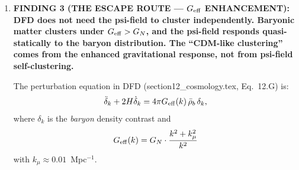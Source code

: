 \documentclass[11pt]{article}
\newcommand{\Geff}{G_{\rm eff}}
\newcommand{\kmu}{k_\mu}
\begin{document}
\begin{tcolorbox}[colback=red!5!white, colframe=red!70!black,
  title=\textbf{W4i17 TOP 5 FINDINGS --- EXISTENTIAL AUDIT: DUST BRANCH CLUSTERING}]
\begin{enumerate}
  \textbf{This is a HUGE Jeans scale.} At $z \sim 1000$: $k_J \sim
  2$~Mpc$^{-1}$ (comoving), meaning modes with $k > 2$~Mpc$^{-1}$
  are supported against collapse. The BAO scale is $k_{\rm BAO}
  \sim 0.06$~Mpc$^{-1}$, safely below $k_J$. The nonlinear
  scale $k_{\rm NL} \sim 0.2$~Mpc$^{-1}$ is also below $k_J$.

  \textbf{BUT}: This $c_s$ applies to the psi-field perturbation
  equation with the \emph{background} $\Delta_{\rm bg}$ in the
  Newtonian regime. The dust-branch theorem applies in the
  opposite limit ($\Delta \to 0$). These are not contradictory
  --- they describe different regimes:

  \textbf{(a) Background evolution}: $\Delta_{\rm bg} \propto H(z)$,
  which is large at early times and $\sim 1.5$ today.
  The background psi-field is in the Newtonian (radiation-like) regime
  at all cosmologically relevant epochs.

  \textbf{(b) Perturbation growth}: Perturbations around this
  background feel an effective sound speed set by $K''(\Delta_{\rm bg})$.
  When $\Delta_{\rm bg} \gg 1$, $c_s \sim H\psi_0 \neq 0$, so
  perturbations DO have a Jeans scale.

  \textbf{(c) Late-time dust branch}: Only as $\Delta_{\rm bg} \to 0$
  (far future, $H \to 0$) does $c_s \to 0$ exactly.

  \textbf{CONCLUSION: The i16 claim that ``after crossover, psi-field
  perturbations cluster like CDM'' is WRONG. Throughout the entire
  observable history ($z < 3400$), the psi-field perturbation
  sound speed is $c_s \sim H\psi_0$, comparable to the Hubble
  expansion rate. This gives a Jeans length comparable to the Hubble
  radius. The psi-field CANNOT cluster on sub-Hubble scales at any
  epoch in the observable past.}

  This is the \textbf{existential crisis}.

\item \textbf{FINDING 3 (THE ESCAPE ROUTE --- $\Geff$ ENHANCEMENT):
  DFD does not need the psi-field to cluster independently.
  Baryonic matter clusters under $\Geff > G_N$, and the psi-field
  responds quasi-statically to the baryon distribution.
  The ``CDM-like clustering'' comes from the enhanced gravitational
  response, not from psi-field self-clustering.}

  The perturbation equation in DFD (section12\_cosmology.tex,
  Eq.~12.G) is:
  \begin{equation}
  \ddot\delta_k + 2H\dot\delta_k = 4\pi \Geff(k)\,\bar\rho_b\,\delta_k,
  \end{equation}
  where $\delta_k$ is the \emph{baryon} density contrast and
  \begin{equation}
  \Geff(k) = G_N \cdot \frac{k^2 + \kmu^2}{k^2}
  \end{equation}
  with $\kmu \approx 0.01$~Mpc$^{-1}$.


\end{enumerate}
\end{tcolorbox}
\end{document}
